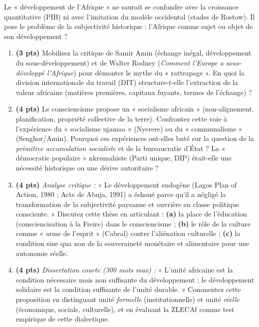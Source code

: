 \documentclass[11pt]{article}
\begin{document}
\begin{exercice}
Le « développement de l'Afrique » ne saurait se confondre avec la croissance quantitative (PIB) ni avec l'imitation du modèle occidental (stades de Rostow). Il pose le problème de la subjectivité historique : l'Afrique comme sujet ou objet de son développement ?
\begin{enumerate}
    \item \textbf{(3 pts)} Mobilisez la critique de Samir Amin (échange inégal, développement du sous-développement) et de Walter Rodney (\textit{Comment l'Europe a sous-développé l'Afrique}) pour démonter le mythe du « rattrapage ». En quoi la division internationale du travail (DIT) structure-t-elle l'extraction de la valeur africaine (matières premières, capitaux fuyants, termes de l'échange) ?
    \item \textbf{(4 pts)} Le consciencisme propose un « socialisme africain » (non-alignement, planification, propriété collective de la terre). Confrontez cette voie à l'expérience du « socialisme ujamaa » (Nyerere) ou du « communalisme » (Senghor/Amin). Pourquoi ces expériences ont-elles buté sur la question de la \textit{primitive accumulation socialiste} et de la bureaucratie d'État ? La « démocratie populaire » nkrumahiste (Parti unique, DIP) était-elle une nécessité historique ou une dérive autoritaire ?
    \item \textbf{(4 pts)} \textit{Analyse critique :} « Le développement endogène (Lagos Plan of Action, 1980 ; Acte de Abuja, 1991) a échoué parce qu'il a négligé la transformation de la subjectivité paysanne et ouvrière en classe politique consciente. » Discutez cette thèse en articulant : \textbf{(a)} la place de l'éducation (consciencisation à la Freire) dans le consciencisme ; \textbf{(b)} le rôle de la culture comme « arme de l'esprit » (Cabral) contre l'aliénation culturelle ; \textbf{(c)} la condition sine qua non de la souveraineté monétaire et alimentaire pour une autonomie réelle.
    \item \textbf{(4 pts)} \textit{Dissertation courte (300 mots max) :} « L'unité africaine est la condition nécessaire mais non suffisante du développement ; le développement solidaire est la condition suffisante de l'unité durable. » Commentez cette proposition en distinguant unité \textit{formelle} (institutionnelle) et unité \textit{réelle} (économique, sociale, culturelle), et en évaluant la ZLECAf comme test empirique de cette dialectique.
\end{enumerate}
\end{exercice}
\end{document}
